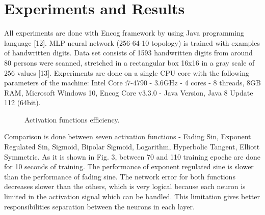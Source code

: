 \documentclass{llncs}
\begin{document}
\section{Experiments and Results}
%
All experiments are done with Encog framework by using Java programming language [12]. MLP neural network  (256-64-10 topology) is trained with examples of handwritten digits. Data set consists of 1593 handwritten digits from around 80 persons were scanned, stretched in a rectangular box 16x16 in a gray scale of 256 values [13]. Experiments are done on a single CPU core with the following parameters of the machine: Intel Core i7-4790 - 3.6GHz - 4 cores - 8 threads, 8GB RAM, Microsoft Windows 10, Encog Core v3.3.0 - Java Version, Java 8 Update 112 (64bit). 
%
\begin{figure}
    \centering
    \caption{Activation functions efficiency.}
    \label{fig:fig02}
\end{figure}
\FloatBarrier
%
Comparison is done between seven activation functions - Fading Sin, Exponent Regulated Sin, Sigmoid, Bipolar Sigmoid, Logarithm, Hyperbolic Tangent, Elliott Symmetric. As it is shown in Fig. 3, between 70 and 110 training epoche are done for 10 seconds of training. The performance of exponent regulated sine is slower than the performance of fading sine. The network error for both functions decreases slower than the others, which is very logical because each neuron is limited in the activation signal which can be handled. This limitation gives better responsibilities separation between the neurons in each layer. 
%
\end{document}

